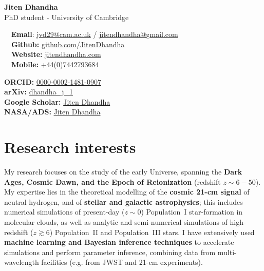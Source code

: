 \documentclass{article}
\begin{document}
\small %


\begin{center}
\huge
\textbf{Jiten Dhandha} \\
\normalsize
PhD student - University of Cambridge \\
\end{center}

\begin{minipage}[ht]{0.6\linewidth}
	\faEnvelope~~\textbf{Email}: \href{mailto:jvd29@cam.ac.uk}{jvd29@cam.ac.uk} / \href{mailto:jitendhandha@gmail.com}{jitendhandha@gmail.com} \\
	\faGithub~~\textbf{Github:} \href{https://github.com/JitenDhandha}{github.com/JitenDhandha}\\
	\faGlobe~~\textbf{Website:} \href{https://jitendhandha.com}{jitendhandha.com} \\
  \faPhone~~\textbf{Mobile:} +44(0)7442793684 \\
\end{minipage}
\begin{minipage}[ht]{0.34\linewidth}
	\begin{flushright}
    \textbf{ORCID:} \href{https://orcid.org/0000-0002-1481-0907}{0000-0002-1481-0907} \\
    \textbf{arXiv:} \href{https://arxiv.org/a/dhandha_j_1.html}{dhandha\_j\_1} \\
    \textbf{Google Scholar:} \href{https://scholar.google.com/citations?user=RjlmcA0AAAAJ}{Jiten Dhandha} \\
    \textbf{NASA/ADS:} \href{https://ui.adsabs.harvard.edu/search/?q=author%3A%22Dhandha%2C+Jiten%22}{Jiten Dhandha} \\
	\end{flushright}
\end{minipage}

\section*{Research interests}

My research focuses on the study of the early Universe, spanning the \textbf{Dark Ages, Cosmic Dawn, and the Epoch of Reionization} (redshift $z\sim 6 - 50$). My expertise lies in the theoretical modelling of the \textbf{cosmic 21-cm signal} of neutral hydrogen, and of \textbf{stellar and galactic astrophysics}; this includes numerical simulations of present-day ($z \sim 0$) Population~I star-formation in molecular clouds, as well as analytic and semi-numerical simulations of high-redshift ($z \gtrsim 6$) Population~II and Population~III stars. I have extensively used \textbf{machine learning and Bayesian inference techniques} to accelerate simulations and perform parameter inference, combining data from multi-wavelength facilities (e.g. from JWST and 21-cm experiments).
\end{document}
